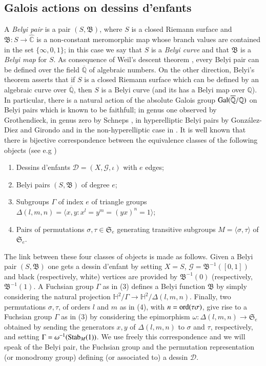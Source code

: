 \documentclass[12pt]{amsart}
\theoremstyle{remark}
\begin{document}
\subsection{Galois actions on dessins d'enfants}
A {\it Belyi pair} is a pair $(S,{\mathfrak B})$, where $S$ is a closed Riemann surface and ${\mathfrak B}:S \to \widehat{\mathbb C}$ is a non-constant meromorphic map whose branch values are contained in the set $\{\infty,0,1\}$; in this case we say that $S$ is a {\it Belyi curve} and that ${\mathfrak B}$ is a {\it Belyi map} for $S$. As consequence of Weil's descent theorem \cite{Weil}, every Belyi pair can be defined over the field $\overline{\mathbb Q}$ of algebraic numbers. On the other direction, Belyi's theorem \cite{Belyi} asserts that if $S$ is a closed Riemann surface which can be defined by an algebraic curve over $\overline{\mathbb Q}$, then $S$ is a Belyi curve (and its has a Belyi map over ${\mathbb Q}$). In particular, there is a natural action of the absolute Galois group ${\rm Gal}(\overline{\mathbb Q}/{\mathbb Q})$ on Belyi pairs which is known to be faithfull; in genus one observed by Grothendieck, in genus zero by Schneps  \cite{Sch}, in hyperelliptic Belyi pairs by Gonz\'alez-Diez and Girondo \cite{GiGo, GiGo1} and in the non-hyperelliptic case in \cite{HJ}. 
It is well known that there is bijective correspondence between the equivalence classes of the following  objects  (see e.g \cite{GiGo, Gro, JW})
\begin{enumerate}
\item Dessins d'enfants  ${\mathcal D}=(X,{\mathcal G}, \iota)$ with $e$ edges;
\item Belyi pairs $(S, {\mathfrak B})$ of degree $e$; 
\item Subgroups $\Gamma$ of index $e$ of triangle groups $\Delta(l,m,n)=\langle x,y: x^{l}=y^{m}=(yx)^{n}=1\rangle$;
\item Pairs of  permutations  $\sigma, \tau  \in {\mathfrak S}_{e}$  generating transitive subgroups $M=\langle \sigma, \tau \rangle$ of ${\mathfrak S}_{e}$.
\end{enumerate}

The link between these four classes of objects is made as follows. Given a Belyi pair $(S, {\mathfrak B})$ one gets a dessin d'enfant by setting $X = S$, ${\mathcal G}= {\mathfrak B}^{-1}([0,1])$ and black (respectively, white) vertices are provided by ${\mathfrak B}^{-1}(0)$ (respectively, ${\mathfrak B}^{-1}(1)$.
A Fuchsian  group $\Gamma$ as in (3)  defines a Belyi function ${\mathfrak B}$ by simply considering the natural projection  ${\mathbb H}^{2}/ \Gamma \to  {\mathbb H}^{2}/ \Delta(l,m,n)$.
Finally, two permutations  $\sigma, \tau$,  of orders $l$ and $m$  as in (4),  with $n={\rm ord}(\tau \sigma)$,  give rise to a Fuchsian  group  $\Gamma$ as in (3) by considering the epimorphism  
$\omega: \Delta(l,m,n) \to {\mathfrak S}_{e}$  obtained   by sending the generators $x,y$   of  $\Delta(l,m,n)$    to $\sigma$ and $\tau$, respectively, and setting   $\Gamma =\omega^{-1}({\rm Stab}_{M}(1))$.
We use freely this correspondence and we will speak of the Belyi pair, the Fuchsian group and the permutation representation (or monodromy group) defining (or associated to) a dessin ${\mathcal D}$.
\end{document}
